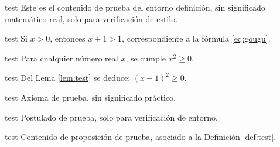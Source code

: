 \documentclass[es]{../../elegantbook}
\begin{document}
\ifdefined\simpleTest
\begin{definition}\label{def:test}
\else
\begin{definition}{test}
\fi
Este es el contenido de prueba del entorno definición, sin significado matemático real, solo para verificación de estilo.
\end{definition}

\ifdefined\simpleTest
\begin{theorem}\label{thm:test}
\else
\begin{theorem}{test}
\fi
Si $x>0$, entonces $x+1>1$, correspondiente a la fórmula \eqref{eq:gougu}.
\end{theorem}

\ifdefined\simpleTest
\begin{lemma}\label{lem:test}
\else
\begin{lemma}{test}
\fi
Para cualquier número real $x$, se cumple $x^2\geq0$.
\end{lemma}

\ifdefined\simpleTest
\begin{corollary}\label{cor:test}
\else
\begin{corollary}{test}
\fi
Del Lema \ref{lem:test} se deduce: $(x-1)^2\geq0$.
\end{corollary}

\ifdefined\simpleTest
\begin{axiom}\label{axi:test}
\else
\begin{axiom}{test}
\fi
Axioma de prueba, sin significado práctico.
\end{axiom}

\ifdefined\simpleTest
\begin{postulate}\label{pos:test}
\else
\begin{postulate}{test}
\fi
Postulado de prueba, solo para verificación de entorno.
\end{postulate}

\ifdefined\simpleTest
\begin{proposition}\label{pro:test}
\else
\begin{proposition}{test}
\fi
Contenido de proposición de prueba, asociado a la Definición \ref{def:test}.
\end{proposition}


\end{proposition}
\end{postulate}
\end{axiom}
\end{corollary}
\end{lemma}
\end{theorem}
\end{definition}
\end{document}
